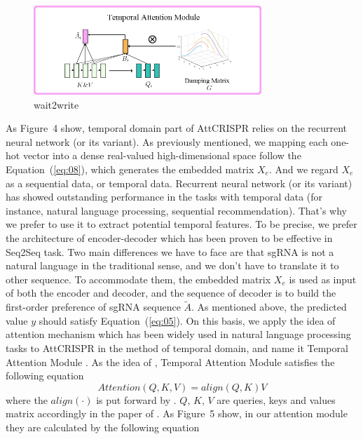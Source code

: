 \documentclass{bioinfo}
\begin{document}
\begin{figure}[!tpb]%
    \centerline{\includegraphics[width=86mm]{temporalattentionmodule.png}}
    \caption{wait2write
    }\label{fig:03}
\end{figure}
As Figure~4\vphantom{\ref{fig:04}} show, temporal domain part of AttCRISPR relies on the recurrent neural network (or its variant). 
As previously mentioned, we mapping each one-hot vector into a dense real-valued high-dimensional space follow the Equation~(\ref{eq:08}), which generates the embedded matrix $X_e$.
And we regard $X_{e}$ as a sequential data, or temporal data.
Recurrent neural network (or its variant) has showed outstanding performance in the tasks with temporal data (for instance, natural language processing, sequential recommendation). 
That's why we prefer to use it to extract potential temporal features. 
To be precise, we prefer the architecture of encoder-decoder which has been proven to be effective in Seq2Seq task. 
Two main differences we have to face are that sgRNA is not a natural language in the traditional sense, and we don't have to translate it to other sequence. 
To accommodate them, the embedded matrix $X_e$ is used as input of both the encoder and decoder, and the sequence of decoder is to build the first-order preference of sgRNA sequence $\tilde{A}$. 
As mentioned above, the predicted value $y$ should satisfy Equation~(\ref{eq:05}). 
On this basis, we apply the idea of attention mechanism which has been widely used in natural language processing tasks to AttCRISPR in the method of temporal domain, 
and name it Temporal Attention Module \citep{vaswani2017attention,luong2015effective,bahdanau2014neural}.
As the idea of \citeauthor{vaswani2017attention}, Temporal Attention Module satisfies the following equation
\begin{equation}
Attention(Q,K,V)=align(Q,K)V\label{eq:13}
\end{equation}
where the $align(\cdot)$ is put forward by \citeauthor{luong2015effective}. 
$Q$, $K$, $V$ are queries, keys and values matrix accordingly in the paper of \citeauthor{vaswani2017attention}. 
As Figure~5\vphantom{\ref{fig:05}} show, in our attention module they are calculated by the following equation
\end{document}
